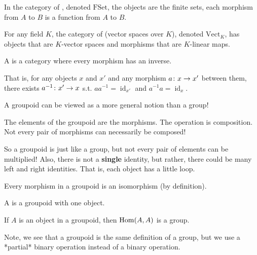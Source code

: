 \documentclass[11pt,leqno,oneside]{amsart}
\numberwithin{thm}{section}
\newcommand{\id}{\operatorname{id}}
\begin{document}
\begin{defn}
  In the category of , denoted $\text{FSet}$, the
  objects are the finite sets, each morphism from $A$ to $B$ is a
  function from $A$ to $B$.
\end{defn}
\begin{defn}
  For any field $K$, the category of  (vector spaces over $K$), denoted
  $\text{Vect}_K$, has objects that are $K$-vector spaces and
  morphisms that are $K$-linear maps.
\end{defn}
\begin{defn}
  A  is a category where every morphism has an inverse.

  That is, for any objects $x$ and $x'$ and any morphism $a \colon x \to x'$ between them, there exists $a^{-1} \colon x' \to x$
  s.t. $aa^{-1} = \id_{x'}$ and $a^{-1}a = \id_{x}$.
\end{defn}
\begin{rmk}
  A groupoid can be viewed as a more general notion than a group!

  The elements of the groupoid are the morphisms.  The operation is composition.  Not every pair of morphisms can necessarily be composed!

  So a groupoid is just like a group, but not every pair of elements can be multiplied!  Also, there is not a \textbf{single} identity, but rather, there could be many left and right identities.  That is, each object has a little loop.
\end{rmk}
\begin{prop}
  Every morphism in a groupoid is an isomorphism (by definition).
\end{prop}
\begin{defn}
  A  is a groupoid with one object.
\end{defn}
\begin{prop}
  If $A$ is an object in a groupoid, then $\operatorname{Hom}(A, A)$ is a group.
\end{prop}

Note, we see that a groupoid is the same definition of a group, but we
use a *partial* binary operation instead of a binary operation.
\end{document}
